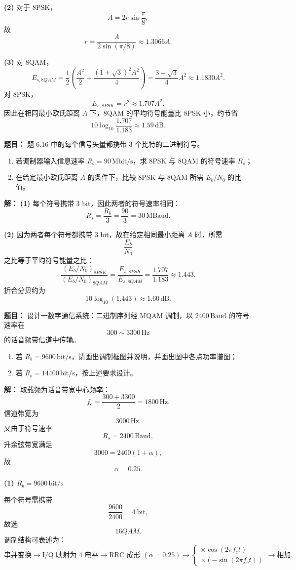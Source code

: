 \textbf{(2)} 对于 8PSK，
\[
A=2r\sin\frac{\pi}{8},
\]
故
\[
r=\frac{A}{2\sin(\pi/8)}\approx 1.3066A.
\]

\textbf{(3)} 对 8QAM，
\[
E_{s,8QAM}
=\frac12\left(\frac{A^2}{2}+\frac{(1+\sqrt3)^2A^2}{4}\right)
=\frac{3+\sqrt3}{4}A^2
\approx 1.1830A^2.
\]
对 8PSK，
\[
E_{s,8PSK}=r^2\approx 1.707A^2.
\]
因此在相同最小欧氏距离 $A$ 下，8QAM 的平均符号能量比 8PSK 小，约节省
\[
10\log_{10}\frac{1.707}{1.183}\approx 1.59\,\mathrm{dB}.
\]

\medskip
{}
\textbf{题目：}
题 6.16 中的每个信号矢量都携带 3 个比特的二进制符号。
\begin{enumerate}
\item 若调制器输入信息速率 $R_b=90\,\mathrm{Mbit/s}$，求 8PSK 与 8QAM 的符号速率 $R_s$；
\item 在给定最小欧氏距离 $A$ 的条件下，比较 8PSK 与 8QAM 所需 $E_b/N_0$ 的比值。
\end{enumerate}

\par\textbf{解：}
\textbf{(1)} 每个符号携带 3 bit，因此两者的符号速率相同：
\[
R_s=\frac{R_b}{3}=\frac{90}{3}=30\,\mathrm{MBaud}.
\]

\textbf{(2)} 因为两者每个符号都携带 3 bit，故在给定相同最小距离 $A$ 时，所需
\[
\frac{E_b}{N_0}
\]
之比等于平均符号能量之比：
\[
\frac{(E_b/N_0)_{8PSK}}{(E_b/N_0)_{8QAM}}
=\frac{E_{s,8PSK}}{E_{s,8QAM}}
=\frac{1.707}{1.183}
\approx 1.443.
\]
折合分贝约为
\[
10\log_{10}(1.443)\approx 1.60\,\mathrm{dB}.
\]

\medskip
{}
\textbf{题目：}
设计一数字通信系统：二进制序列经 MQAM 调制，以 $2400\,\mathrm{Baud}$ 的符号速率在
\[
300\sim3300\,\mathrm{Hz}
\]
的话音频带信道中传输。
\begin{enumerate}
\item 若 $R_b=9600\,\mathrm{bit/s}$，请画出调制框图并说明，并画出图中各点功率谱图；
\item 若 $R_b=14400\,\mathrm{bit/s}$，按上述要求设计。
\end{enumerate}

\par\textbf{解：}
取载频为话音带宽中心频率：
\[
f_c=\frac{300+3300}{2}=1800\,\mathrm{Hz}.
\]
信道带宽为
\[
3000\,\mathrm{Hz}.
\]
又由于符号速率
\[
R_s=2400\,\mathrm{Baud},
\]
升余弦带宽满足
\[
3000=2400(1+\alpha),
\]
故
\[
\alpha=0.25.
\]

\textbf{(1) $R_b=9600\,\mathrm{bit/s}$}\par
每个符号需携带
\[
\frac{9600}{2400}=4\ \text{bit},
\]
故选
\[
16QAM.
\]
调制结构可表述为：
\[
\text{串并变换}
\rightarrow
\text{I/Q 映射为 4 电平}
\rightarrow
\text{RRC 成形 }(\alpha=0.25)
\rightarrow
\begin{cases}
\times \cos(2\pi f_ct)\\
\times (-\sin(2\pi f_ct))
\end{cases}
\rightarrow
\text{相加}.
\]

